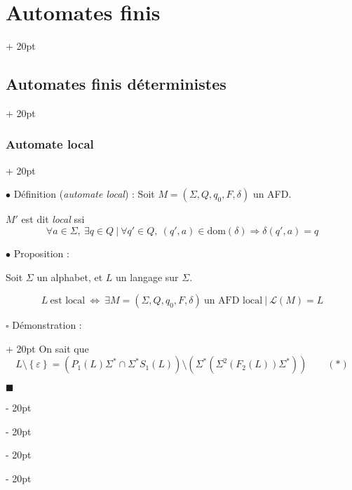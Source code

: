\documentclass[a4paper, 12pt, twoside]{article}
\newcommand{\lr}[1]{\left( #1 \right)}
\newcommand{\set}[1]{\left\{ #1 \right\}}
\newcommand{\ssi}{\ \Leftrightarrow \ }
\newcommand{\ind}[1][20pt]{\advance\leftskip + #1}
\newcommand{\deind}[1][20pt]{\advance\leftskip - #1}
\newenvironment{indt}[2][20pt]{#2 \par \ind[#1]}{\par \deind} %
\newenvironment{proof}[1][{Démonstration :}]{\begin{indt}{$\square$ #1}}{$\blacksquare$ \end{indt}}
\begin{document}
\begin{indt}{\section{Automates finis}}
\begin{indt}{\subsection{Automates finis déterministes}}
\begin{indt}{\subsubsection{Automate local}}
\begin{center}
                \end{center}

                \vspace{12pt}
                
                $\bullet$ Définition (\emph{automate local}) : Soit $M = (\Sigma, Q, q_0, F, \delta)$ un AFD.

                $M'$ est dit \emph{local} ssi
                \[
                    \forall a \in \Sigma,\ \exists q \in Q\ |\ \forall q' \in Q,\
                    (q', a) \in \mathrm{dom}(\delta) \Rightarrow \delta(q', a) = q
                \]

                \vspace{12pt}
                
                $\bullet$ Proposition :
                \begin{emphBox}
                    Soit $\Sigma$ un alphabet, et $L$ un langage sur $\Sigma$.

                    \[
                        L\ \text{est local}
                        \ssi
                        \exists M = (\Sigma, Q, q_0, F, \delta)\ \text{un AFD local}\ |\
                        \mathcal L(M) = L
                    \]
                \end{emphBox}

                \vspace{6pt}
                
                \begin{proof}
                    \boxed{\Rightarrow} On sait que
                    \[
                        L \setminus \set \varepsilon = \lr{P_1(L) \Sigma^* \cap \Sigma^*S_1(L)} \setminus \lr{\Sigma^*\lr{\Sigma^2 (F_2(L)) \Sigma^*}}
                        \qquad (*)
                \]


\end{proof}
\end{indt}
\end{indt}
\end{indt}
\end{document}
